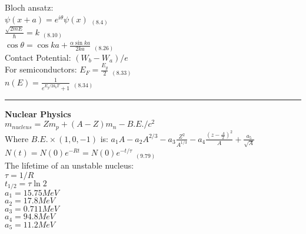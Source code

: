 \documentclass[0pt]{report}
\begin{document}
\begin{multicols*}{3}
\begin{flushleft}
Bloch ansatz:\\
$\psi(x+a)=e^{i\theta}\psi(x)$ $_{(8.4)}$\\
$\frac{\sqrt{2mE}}{\hslash}=k$ $_{(8.10)}$\\
$\cos\theta=\cos ka+\frac{\alpha\sin ka}{2ka}$ $_{(8.26)}$\\
Contact Potential:
$(W_b-W_a)/e$\\
For semiconductors:
$E_F=\frac{E_g}{2}$ $_{(8.33)}$\\
$n(E)=\frac{1}{e^{E_g/2k_bT}+1}$ $_{(8.34)}$\\

\noindent\rule[0.5ex]{\linewidth}{1pt}
\textbf{Nuclear Physics}\\


$m_{nucleus}=Zm_p+(A-Z)m_n-B.E./c^2$\\
Where $B.E.\times(1,0,-1)$ is:
$a_1A-a_2A^{2/3}-a_3\frac{Z^2}{A^{1/3}}-a_4\frac{(z-\frac{A}{2})^2}{A}+\frac{a_5}{\sqrt{A}}$\\
$N(t)=N(0)e^{-Rt}=N(0)e^{-t/\tau}$ $_{(9.79)}$\\
The lifetime of an unstable nucleus:\\
$\tau=1/R$\\
$t_{1/2}=\tau \ln2$\\
$a_1=15.75MeV$\\
$a_2=17.8MeV$\\
$a_3=0.711MeV$\\
$a_4=94.8MeV$\\
$a_5=11.2MeV$\\
\end{flushleft}
\end{multicols*}
\end{document}
